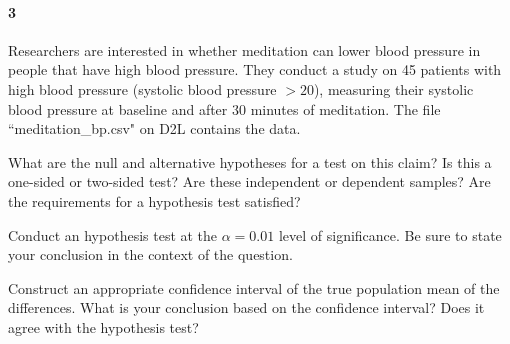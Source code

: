 \documentclass{article}
\begin{document}
\begin{flushleft}
\newpage
\paragraph{3} Researchers are interested in whether meditation can lower blood pressure in people that have high blood pressure. They conduct a study on 45 patients with high blood pressure (systolic blood pressure $> 20$), measuring their systolic blood pressure at baseline and after 30 minutes of meditation. The file ``meditation\_bp.csv" on D2L contains the data.
\begin{enumalpha}
\item What are the null and alternative hypotheses for a test on this claim? Is this a one-sided or two-sided test? Are these independent or dependent samples? Are the requirements for a hypothesis test satisfied?
\vspace{2.25in}
\item Conduct an hypothesis test at the $\alpha = 0.01$ level of significance. Be sure to state your conclusion in the context of the question.
\vspace{2.25in}
\item Construct an appropriate confidence interval of the true population mean of the differences. What is your conclusion based on the confidence interval? Does it agree with the hypothesis test?
\end{enumalpha}



\end{flushleft}
\end{document}
